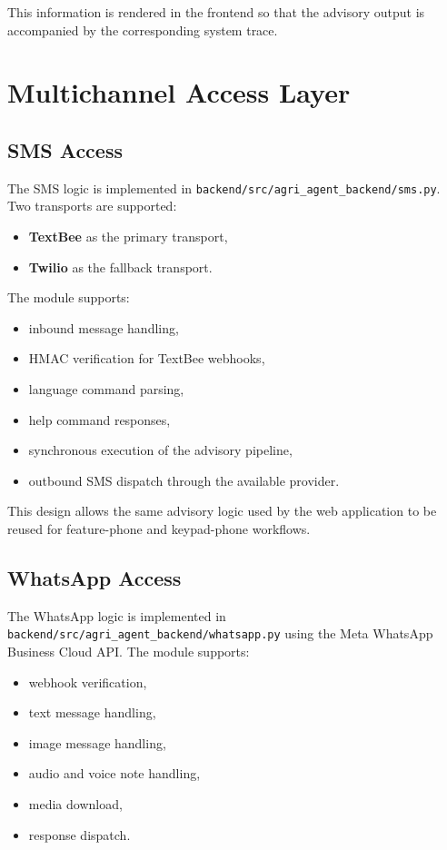 \documentclass[11pt,a4paper]{article}
\begin{document}
This information is rendered in the frontend so that the advisory output is accompanied by the corresponding system trace.

\section{Multichannel Access Layer}

\subsection{SMS Access}

The SMS logic is implemented in \texttt{backend/src/agri\_agent\_backend/sms.py}. Two transports are supported:

\begin{itemize}
  \item \textbf{TextBee} as the primary transport,
  \item \textbf{Twilio} as the fallback transport.
\end{itemize}

The module supports:

\begin{itemize}
  \item inbound message handling,
  \item HMAC verification for TextBee webhooks,
  \item language command parsing,
  \item help command responses,
  \item synchronous execution of the advisory pipeline,
  \item outbound SMS dispatch through the available provider.
\end{itemize}

This design allows the same advisory logic used by the web application to be reused for feature-phone and keypad-phone workflows.

\subsection{WhatsApp Access}

The WhatsApp logic is implemented in \texttt{backend/src/agri\_agent\_backend/whatsapp.py} using the Meta WhatsApp Business Cloud API. The module supports:

\begin{itemize}
  \item webhook verification,
  \item text message handling,
  \item image message handling,
  \item audio and voice note handling,
  \item media download,
  \item response dispatch.
\end{itemize}
\end{document}

